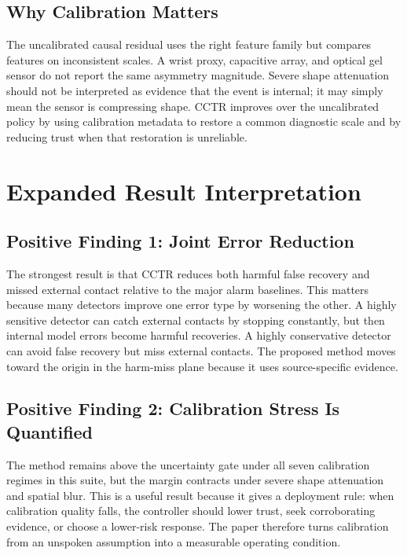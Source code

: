 \documentclass{article}
\newcommand{\method}{CCTR}
\begin{document}
\subsection{Why Calibration Matters}

The uncalibrated causal residual uses the right feature family but compares features on inconsistent scales. A wrist proxy, capacitive array, and optical gel sensor do not report the same asymmetry magnitude. Severe shape attenuation should not be interpreted as evidence that the event is internal; it may simply mean the sensor is compressing shape. \method{} improves over the uncalibrated policy by using calibration metadata to restore a common diagnostic scale and by reducing trust when that restoration is unreliable.

\section{Expanded Result Interpretation}

\subsection{Positive Finding 1: Joint Error Reduction}

The strongest result is that \method{} reduces both harmful false recovery and missed external contact relative to the major alarm baselines. This matters because many detectors improve one error type by worsening the other. A highly sensitive detector can catch external contacts by stopping constantly, but then internal model errors become harmful recoveries. A highly conservative detector can avoid false recovery but miss external contacts. The proposed method moves toward the origin in the harm-miss plane because it uses source-specific evidence.

\subsection{Positive Finding 2: Calibration Stress Is Quantified}

The method remains above the uncertainty gate under all seven calibration regimes in this suite, but the margin contracts under severe shape attenuation and spatial blur. This is a useful result because it gives a deployment rule: when calibration quality falls, the controller should lower trust, seek corroborating evidence, or choose a lower-risk response. The paper therefore turns calibration from an unspoken assumption into a measurable operating condition.
\end{document}
